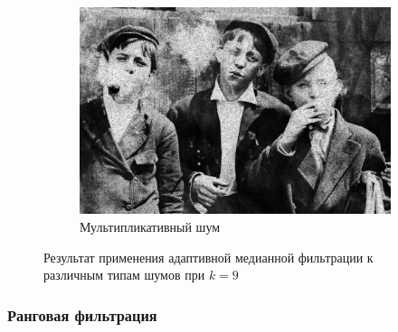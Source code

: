 \begin{figure}[ht!]
\begin{subfigure}[b]{0.5\linewidth}
      \includegraphics[width=0.95\linewidth]{../Adaptive_Median_Filter/Adaptive_Median_Speckle_noise_k=9.jpg} 
      \caption{Мультипликативный шум} 
  \end{subfigure} 
  \caption{Результат применения адаптивной медианной фильтрации к различным типам шумов при $k = 9$}
\end{figure}
\FloatBarrier

\subsubsection{Ранговая фильтрация}

